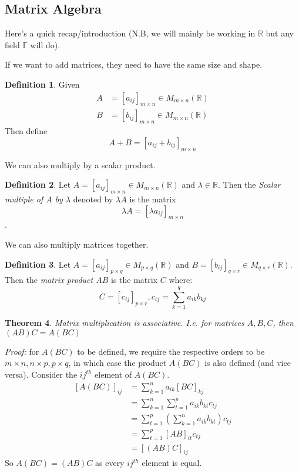 \documentclass{report}
\newtheorem{theorem}{Theorem}[subsection]
\theoremstyle{remark}
\theoremstyle{definition}
\newtheorem{definition}[theorem]{Definition}
\theoremstyle{definition}
\theoremstyle{theorem}
\begin{document}
\subsection{Matrix Algebra}
Here's a quick recap/introduction (N.B, we will mainly be working in $\mathbb{R}$ but any field $\mathbb{F}$ will do).\par
If we want to add matrices, they need to have the same size and shape.
\begin{definition}
Given \[
\begin{split}
A &= [a_{ij}]_{m \times n} \in M_{m \times n}(\mathbb{R})\\
B &= [b_{ij}]_{m \times n} \in M_{m \times n}(\mathbb{R})
\end{split}
\]
Then define
\[ A + B = [a_{ij} + b_{ij}]_{m \times n}\]
\end{definition}
We can also multiply by a scalar product.
\begin{definition}
Let $A = [a_{ij}]_{m \times n} \in M_{m \times n}(\mathbb{R})$ and $\lambda \in \mathbb{R}$. Then the \emph{Scalar multiple of $A$ by $\lambda$} denoted by $\lambda A$ is the matrix
\[\lambda A = [\lambda a_{ij}]_{m \times n}\].
\end{definition}
We can also multiply matrices together.
\begin{definition}
Let $A = [a_{ij}]_{p \times q} \in M_{p \times q}(\mathbb{R})$ and $B= [b_{ij}]_{q \times r} \in M_{q \times r}(\mathbb{R})$. Then the \emph{matrix product $AB$} is the matrix $C$ where:
\[C = [c_{ij}]_{p \times r}, c_{ij} = \sum_{k=1}^q a_{ik}b_{kj}\]
\end{definition}
\begin{theorem}
Matrix multiplication is associative. I.e. for matrices $A, B, C$, then $(AB)C = A(BC)$
\end{theorem}
\emph{Proof:} for $A(BC)$ to be defined, we require the respective orders to be $m \times n, n \times p, p \times q$, in which case the product $A(BC)$ is also defined (and vice versa). Consider the $ij^{th}$ element of $A(BC)$.
\[
\begin{split}
[A(BC)]_{ij} &= \sum_{k=1}^n a_{ik}[BC]_{kj}\\
&=\sum_{k=1}^n\sum_{t=1}^p a_{ik}b_{kt}c_{tj}\\
&=\sum_{t=1}^{p}\left(\sum_{k=1}^n a_{ik}b_{kt}\right)c_{tj}\\
&=\sum_{t=1}^p [AB]_{it}c_{tj}\\
&=[(AB)C]_{ij}
\end{split}
\]
So $A(BC)=(AB)C$ as every $ij^{th}$ element is equal.
\end{document}
